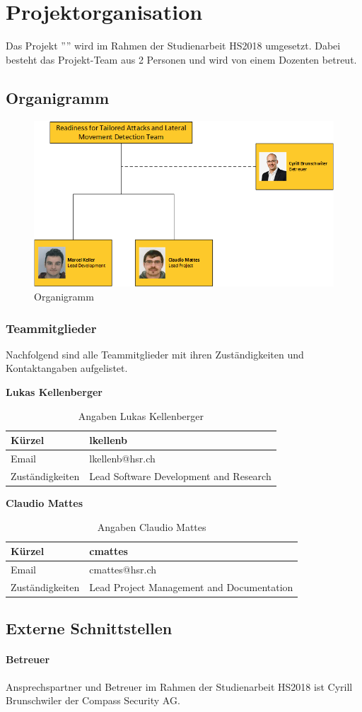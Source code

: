 \section{Projektorganisation}
Das Projekt ''\TITLE'' wird im Rahmen der Studienarbeit HS2018 umgesetzt. Dabei besteht das Projekt-Team aus 2 Personen und wird von einem Dozenten betreut.

\subsection{Organigramm}
\begin{figure}[H]
    \centering
    \includegraphics[width=0.7\linewidth]{assets/organigramm.png}
    \caption{Organigramm}
\end{figure}

\subsubsection{Teammitglieder}
Nachfolgend sind alle Teammitglieder mit ihren Zuständigkeiten und Kontaktangaben aufgelistet.

\vspace{5mm}
\textbf{Lukas Kellenberger}

\begin{table}[H]
    \centering
    \begin{tabular}{p{4cm} p{8cm}} \hline
        Kürzel & lkellenb  \\ \hline
        Email & lkellenb@hsr.ch  \\ \hline
        Zuständigkeiten & Lead Software Development and Research \\ \hline
    \end{tabular}
    \caption{Angaben Lukas Kellenberger}
\end{table}

\textbf{Claudio Mattes}

\begin{table}[H]
    \centering
    \begin{tabular}{p{4cm} p{8cm}} \hline
        Kürzel & cmattes  \\ \hline
        Email & cmattes@hsr.ch  \\ \hline
        Zuständigkeiten & Lead Project Management and Documentation \\ \hline
    \end{tabular}
    \caption{Angaben Claudio Mattes}
\end{table}

\subsection{Externe Schnittstellen}

\paragraph{Betreuer} Ansprechspartner und Betreuer im Rahmen der Studienarbeit HS2018 ist Cyrill Brunschwiler der Compass Security AG.
